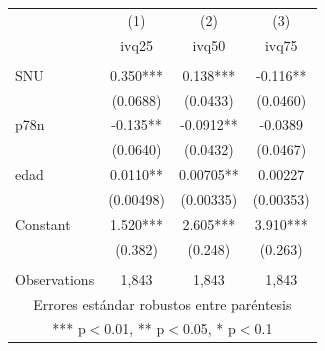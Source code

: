 
\begin{tabular}{lccc} \hline
 & (1) & (2) & (3) \\
 & ivq25 & ivq50 & ivq75 \\ \hline
 &  &  &  \\
SNU & 0.350*** & 0.138*** & -0.116** \\
 & (0.0688) & (0.0433) & (0.0460) \\
p78n & -0.135** & -0.0912** & -0.0389 \\
 & (0.0640) & (0.0432) & (0.0467) \\
edad & 0.0110** & 0.00705** & 0.00227 \\
 & (0.00498) & (0.00335) & (0.00353) \\
Constant & 1.520*** & 2.605*** & 3.910*** \\
 & (0.382) & (0.248) & (0.263) \\
 &  &  &  \\
 Observations & 1,843 & 1,843 & 1,843 \\ \hline
\multicolumn{4}{c}{Errores estándar robustos entre paréntesis} \\
\multicolumn{4}{c}{ *** p$<$0.01, ** p$<$0.05, * p$<$0.1} \\
\end{tabular}
